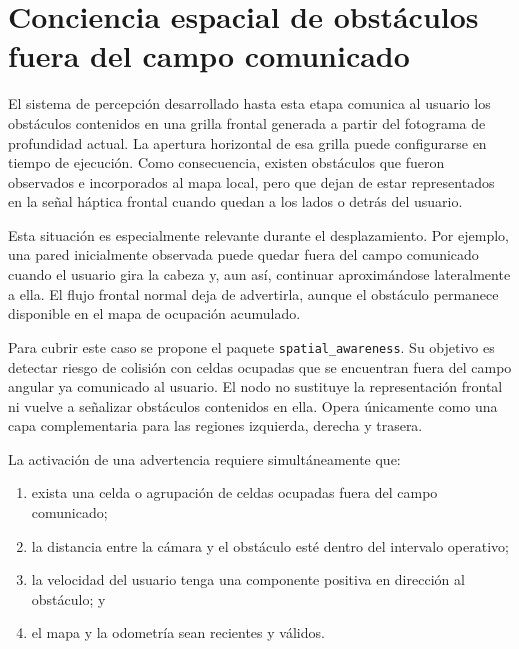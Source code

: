%

\section{Conciencia espacial de obstáculos fuera del campo comunicado}
\label{sec:spatial-awareness}

El sistema de percepción desarrollado hasta esta etapa comunica al usuario los
obstáculos contenidos en una grilla frontal generada a partir del fotograma de
profundidad actual. La apertura horizontal de esa grilla puede configurarse en
tiempo de ejecución. Como consecuencia, existen obstáculos que fueron
observados e incorporados al mapa local, pero que dejan de estar representados
en la señal háptica frontal cuando quedan a los lados o detrás del usuario.

Esta situación es especialmente relevante durante el desplazamiento. Por
ejemplo, una pared inicialmente observada puede quedar fuera del campo
comunicado cuando el usuario gira la cabeza y, aun así, continuar
aproximándose lateralmente a ella. El flujo frontal normal deja de advertirla,
aunque el obstáculo permanece disponible en el mapa de ocupación acumulado.

Para cubrir este caso se propone el paquete \texttt{spatial\_awareness}. Su
objetivo es detectar riesgo de colisión con celdas ocupadas que se encuentran
fuera del campo angular ya comunicado al usuario. El nodo no sustituye la
representación frontal ni vuelve a señalizar obstáculos contenidos en ella.
Opera únicamente como una capa complementaria para las regiones izquierda,
derecha y trasera.

La activación de una advertencia requiere simultáneamente que:
%
\begin{enumerate}
  \item exista una celda o agrupación de celdas ocupadas fuera del campo
    comunicado;
  \item la distancia entre la cámara y el obstáculo esté dentro del intervalo
    operativo;
  \item la velocidad del usuario tenga una componente positiva en dirección
    al obstáculo; y
  \item el mapa y la odometría sean recientes y válidos.
\end{enumerate}


